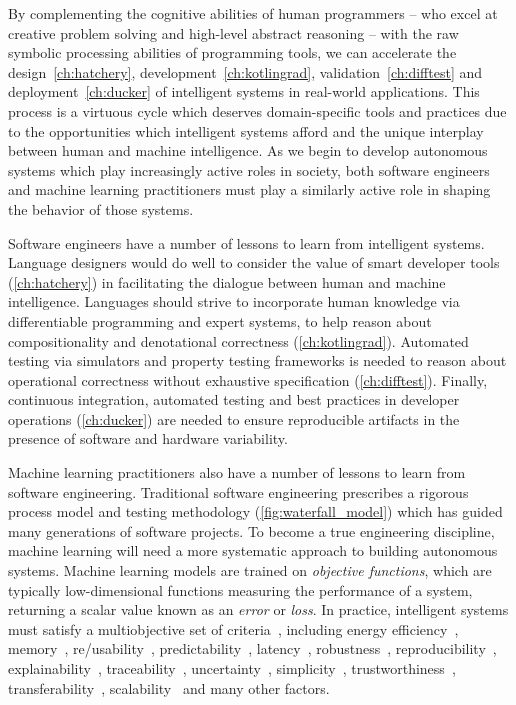 By complementing the cognitive abilities of human programmers -- who excel at creative problem solving and high-level abstract reasoning -- with the raw symbolic processing abilities of programming tools, we can accelerate the design~\autoref{ch:hatchery}, development~\autoref{ch:kotlingrad}, validation~\autoref{ch:difftest} and deployment~\autoref{ch:ducker} of intelligent systems in real-world applications. This process is a virtuous cycle which deserves domain-specific tools and practices due to the opportunities which intelligent systems afford and the unique interplay between human and machine intelligence. As we begin to develop autonomous systems which play increasingly active roles in society, both software engineers and machine learning practitioners must play a similarly active role in shaping the behavior of those systems.

Software engineers have a number of lessons to learn from intelligent systems. Language designers would do well to consider the value of smart developer tools (\autoref{ch:hatchery}) in facilitating the dialogue between human and machine intelligence. Languages should strive to incorporate human knowledge via differentiable programming and expert systems, to help reason about compositionality and denotational correctness (\autoref{ch:kotlingrad}). Automated testing via simulators and property testing frameworks is needed to reason about operational correctness without exhaustive specification (\autoref{ch:difftest}). Finally, continuous integration, automated testing and best practices in developer operations (\autoref{ch:ducker}) are needed to ensure reproducible artifacts in the presence of software and hardware variability.

Machine learning practitioners also have a number of lessons to learn from software engineering. Traditional software engineering prescribes a rigorous process model and testing methodology (\autoref{fig:waterfall_model}) which has guided many generations of software projects. To become a true engineering discipline, machine learning will need a more systematic approach to building autonomous systems. Machine learning models are trained on \textit{objective functions}, which are typically low-dimensional functions measuring the performance of a system, returning a scalar value known as an \textit{error} or \textit{loss}. In practice, intelligent systems must satisfy a multiobjective set of criteria~\citep{censi2015mathematical}, including energy efficiency~\citep{paull2010novel}, memory~\citep{memory2013mitliagkas}, re/usability~\citep{breuleux2017automatic,deleu2019torchmeta}, predictability~\citep{turner2017well}, latency~\citep{ravanelli2018twin}, robustness~\citep{pineau2003policy}, reproducibility~\citep{pineau2019improving}, explainability~\citep{turner2016model}, traceability~\citep{guo2017semantically, tsirigotis2018orion}, uncertainty~\citep{diaz2018interactive}, simplicity~\citep{kastner2019representation}, trustworthiness~\citep{xu2017efficient}, transferability~\citep{mehta2019active}, scalability~\citep{luan2019break} and many other factors.

